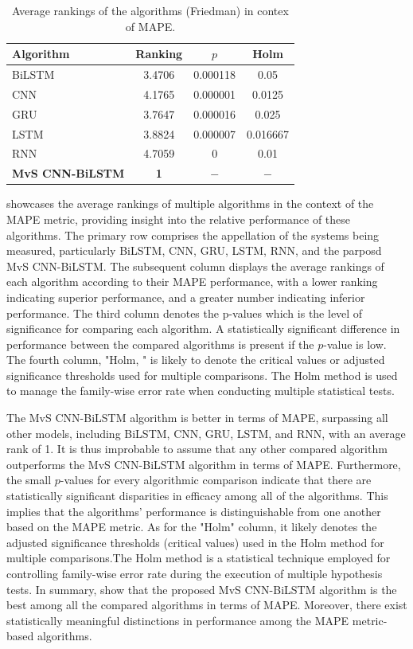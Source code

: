 \documentclass[a4paper, fleqn]{cas-sc}
\theoremstyle{definition}
\theoremstyle{remark}
\begin{document}
    \begin{table}[!htp]
      \caption{Average rankings of the algorithms (Friedman) in contex of MAPE.}
      \centering
      \begin{tabular}{lccc}\hline
      Algorithm&Ranking&$p$&Holm\\\hline
      BiLSTM&3.4706&0.000118&0.05\\
      CNN&4.1765&0.000001&0.0125\\
      GRU&3.7647&0.000016&0.025\\
      LSTM&3.8824&0.000007&0.016667\\
      RNN&4.7059&0&0.01\\
      \textbf{MvS CNN-BiLSTM}&\textbf{1}&$-$ &$-$\\\hline
    \end{tabular}
      
      \label{rank_mape}
      \end{table}
       showcases the average rankings of multiple algorithms in the context of the MAPE metric,  providing insight into the relative performance of these algorithms. The primary row comprises the appellation of the systems being measured,  particularly BiLSTM,  CNN,  GRU,  LSTM,  RNN,  and the parposd MvS CNN-BiLSTM. The subsequent column displays the average rankings of each algorithm according to their MAPE performance,  with a lower ranking indicating superior performance,  and a greater number indicating inferior performance. The third column denotes the p-values which is the level of significance for comparing each algorithm. A statistically significant difference in performance between the compared algorithms is present if the $p$-value is low. The fourth column,  "Holm, " is likely to denote the critical values or adjusted significance thresholds used for multiple comparisons. The Holm method is used to manage the family-wise error rate when conducting multiple statistical tests.
      
      The MvS CNN-BiLSTM algorithm is better in terms of MAPE,  surpassing all other models,  including BiLSTM,  CNN,  GRU,  LSTM,  and RNN,  with an average rank of 1. It is thus improbable to assume that any other compared algorithm outperforms the MvS CNN-BiLSTM algorithm in terms of MAPE. Furthermore,  the small $p$-values for every algorithmic comparison indicate that there are statistically significant disparities in efficacy among all of the algorithms. This implies that the algorithms' performance is distinguishable from one another based on the MAPE metric. As for the "Holm" column,  it likely denotes the adjusted significance thresholds (critical values) used in the Holm method for multiple comparisons.The Holm method is a statistical technique employed for controlling family-wise error rate during the execution of multiple hypothesis tests. In summary,   show that the proposed MvS CNN-BiLSTM algorithm is the best among all the compared algorithms in terms of MAPE. Moreover,  there exist statistically meaningful distinctions in performance among the MAPE metric-based algorithms.
    
\end{document}
